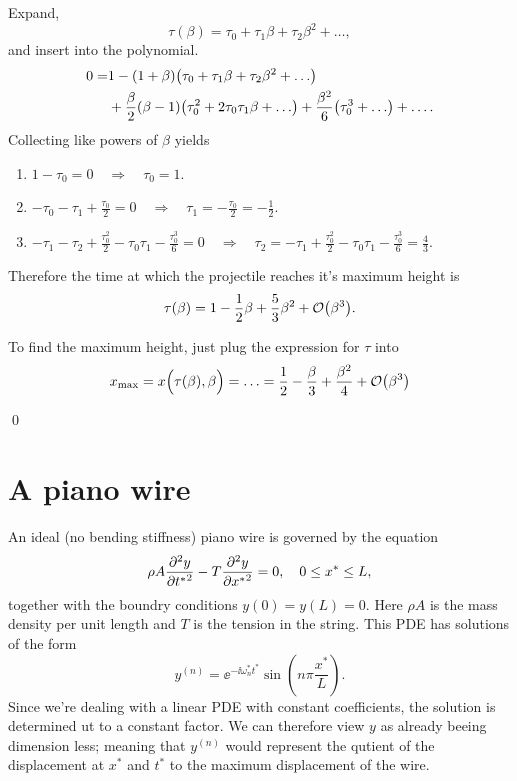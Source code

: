 \documentclass[11pt,letter, swedish, english
]{article}
\begin{document}
Expand,
\begin{equation}
\tau(\beta) = \tau_0 + \tau_1\beta + \tau_2\beta^2 +\ldots,
\end{equation}
and insert into the polynomial. 
\begin{equation}
\begin{aligned}
0=&1 - (1+\beta)\qty(\tau_0+\tau_1\beta + \tau_2\beta^2+\ldots)\\
&+ \frac{\beta}{2}\qty(\beta -1)\qty(\tau_0^2+2\tau_0\tau_1\beta+\ldots)
+\frac{\beta^2}{6}\qty(\tau_0^3+\ldots) + \ldots.
\end{aligned}
\end{equation}
Collecting like powers of $\beta$
yields
\begin{enumerate}[label=$\order{\beta^{\arabic*}}$: , start=0, leftmargin=2cm]
\item $\displaystyle 1-\tau_0 = 0 \quad\Longrightarrow\quad
\tau_0=1$.
\item $\displaystyle -\tau_0-\tau_1+\frac{\tau_0}{2} = 0 \quad\Longrightarrow\quad
\tau_1= -\frac{\tau_0}{2} = -\frac{1}{2}$.
\item $\displaystyle -\tau_1-\tau_2+\frac{\tau_0^2}{2}-\tau_0\tau_1 -\frac{\tau_0^3}{6}= 0 \quad\Longrightarrow\quad
\tau_2=-\tau_1+\frac{\tau_0^2}{2}-\tau_0\tau_1 -\frac{\tau_0^3}{6} = \frac{4}{3}$.
\end{enumerate}
Therefore the time at which the projectile reaches it's maximum height
is 
\begin{equation}
\tau(\beta) = 1 - \frac{1}{2}\beta + \frac{5}{3}\beta^2 + \order{\beta^3}.
\end{equation}

To find the maximum height, just plug the expression for $\tau$ into
\begin{equation}
x_\text{max} = x\Big(\tau(\beta), \beta\Big)=\ldots
=\frac{1}{2}-\frac{\beta}{3} + \frac{\beta^2}{4} +\order{\beta^3}
\end{equation}

\qed



\section{A piano wire}
\newcommand{\yn}{\ensuremath{}y^{(n)}}

An ideal (no bending stiffness) piano wire is governed by the equation
\begin{equation}
\rho A \pdv[2]{y}{{t^*}} - T\pdv[2]{y}{{x^*}} = 0 \qcomma 0\le x^*\le L,
\end{equation}
together with the boundry conditions $y(0)=y(L)=0$. Here $\rho A$ is
the mass density per unit length and $T$ is the tension in the
string. This PDE has solutions of the form
\begin{equation}
\yn=\ee^{-\ii\omega_n^*t^*}\sin(n\pi\frac{x^*}{L}).
\end{equation}
Since we're dealing with a linear PDE with constant coefficients, the
solution is determined ut to a constant factor. We can therefore view
$y$ as already beeing dimension less; meaning that $\yn$ would
represent the qutient of the displacement at $x^*$ and $t^*$ to the
maximum displacement of the wire. 
\end{document}
